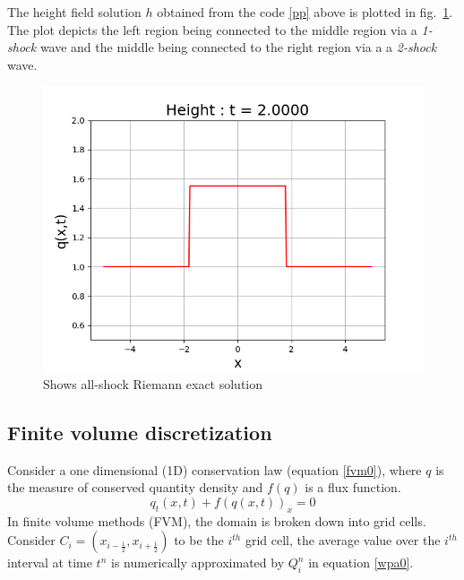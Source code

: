 \documentclass[12pt,a4paper]{article}
\newcommand{\donna}[1]{{\color{red}{#1}}}
\begin{document}
{	The height field solution $h$ obtained from the code \ref{pp} above is plotted in fig.~\ref{fig:2-shock}. The plot depicts the left region being connected to the middle region via a {\em 1-shock } wave and the middle  being connected to the right region via a a {\em 2-shock } wave.
	
	\begin{figure}[H]
		\centering
		\includegraphics[width=0.5\linewidth]{images/2-shock}
		\caption{Shows all-shock Riemann exact solution }
		\label{fig:2-shock}
	\end{figure}
} %

\donna{Not all left and right states can be connected by a shock wave.  In this case, we connect states by a rarefaction wave. See Figure (...) for illustration of evolution of a Riemann problem for the two shock case and for a case in which the left going wave is a rarefaction, and the right going wave is a shock.}

\donna{Include your exact solver solution.  One that shows just the exact solution for a few cases (two shock solution;   one shock and one rarefaction)}	
	
	\subsection{Finite volume discretization}
	\donna{Finite volume discretizations are widely used in tsunami modeling (explain why...).   Reference papers that use finite volume discretizations. The finite volume schemes rely on exact or approximate solutions to the Riemann problem described above.}

	Consider a one dimensional (1D) conservation law  (equation \eqref{fvm0}),  where $q$ is the measure of conserved quantity density and $f(q)$ is a flux function\cite{ge:2011}.
	\begin{equation}
		q_{t}(x,t) + f(q(x,t))_{x} = 0
		\label{fvm0}
	\end{equation}	
	In finite volume methods (FVM), the domain is broken down into grid cells. Consider $C_{i} = (x_{i-\frac{1}{2}},x_{i+\frac{1}{2}})$ to be the $i^{th}$ grid cell, the average value over the $i^{th}$ interval at time $t^{n}$ is numerically approximated by $Q_{i}^{n}$ in equation \eqref{wpa0}.
	
\end{document}
